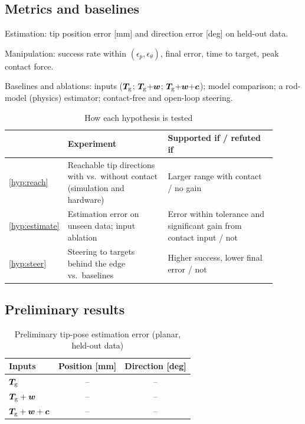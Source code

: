 \subsection{Metrics and baselines}
\label{sec:exp:metrics}
\begin{outline}
  \item Estimation: tip position error [mm] and direction error [deg] on
    held-out data.
  \item Manipulation: success rate within $(\epsilon_p,\epsilon_\theta)$, final
    error, time to target, peak contact force.
  \item Baselines and ablations: inputs ($\bm{T}_{\mathrm{g}}$; $\bm{T}_{\mathrm{g}}{+}\bm{w}$;
    $\bm{T}_{\mathrm{g}}{+}\bm{w}{+}\bm{c}$); model comparison; a rod-model (physics)
    estimator; contact-free and open-loop steering.
\end{outline}

\begin{table}[t]
  \centering
  \caption{How each hypothesis is tested}
  \label{tab:plan}
  \footnotesize
  \begin{tabular}{@{}p{0.06\linewidth}p{0.40\linewidth}p{0.44\linewidth}@{}}
    \toprule
     & Experiment & Supported if / refuted if \\
    \midrule
    \ref{hyp:reach}    & Reachable tip directions with vs.\ without contact
                         (simulation and hardware)
                       & Larger range with contact / no gain \\
    \ref{hyp:estimate} & Estimation error on unseen data; input ablation
                       & Error within tolerance and significant gain from
                         contact input / not \\
    \ref{hyp:steer}    & Steering to targets behind the edge vs.\ baselines
                       & Higher success, lower final error / not \\
    \bottomrule
  \end{tabular}
\end{table}

\subsection{Preliminary results}
\label{sec:exp:prelim}

\begin{table}[t]
  \centering
  \caption{Preliminary tip-pose estimation error (planar, held-out data)}
  \label{tab:prelim}
  \footnotesize
  \begin{tabular}{@{}lcc@{}}
    \toprule
    Inputs & Position [mm] & Direction [deg] \\
    \midrule
    $\bm{T}_{\mathrm{g}}$                    & -- & -- \\
    $\bm{T}_{\mathrm{g}}+\bm{w}$            & -- & -- \\
    $\bm{T}_{\mathrm{g}}+\bm{w}+\bm{c}$       & -- & -- \\
    \bottomrule
  \end{tabular}
\end{table}

